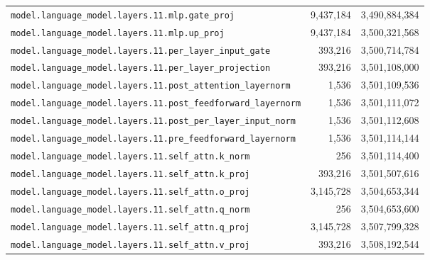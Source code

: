 \documentclass[10pt,a4paper]{article}
\theoremstyle{definition}
\begin{document}
\begin{appendices}
\begin{longtable}{p{9.5cm}rr}
\texttt{model.\allowbreak{}language\_model.\allowbreak{}layers.\allowbreak{}11.\allowbreak{}mlp.\allowbreak{}gate\_proj} & 9,437,184 & 3,490,884,384 \\
\texttt{model.\allowbreak{}language\_model.\allowbreak{}layers.\allowbreak{}11.\allowbreak{}mlp.\allowbreak{}up\_proj} & 9,437,184 & 3,500,321,568 \\
\texttt{model.\allowbreak{}language\_model.\allowbreak{}layers.\allowbreak{}11.\allowbreak{}per\_layer\_input\_gate} & 393,216 & 3,500,714,784 \\
\texttt{model.\allowbreak{}language\_model.\allowbreak{}layers.\allowbreak{}11.\allowbreak{}per\_layer\_projection} & 393,216 & 3,501,108,000 \\
\texttt{model.\allowbreak{}language\_model.\allowbreak{}layers.\allowbreak{}11.\allowbreak{}post\_attention\_layernorm} & 1,536 & 3,501,109,536 \\
\texttt{model.\allowbreak{}language\_model.\allowbreak{}layers.\allowbreak{}11.\allowbreak{}post\_feedforward\_layernorm} & 1,536 & 3,501,111,072 \\
\texttt{model.\allowbreak{}language\_model.\allowbreak{}layers.\allowbreak{}11.\allowbreak{}post\_per\_layer\_input\_norm} & 1,536 & 3,501,112,608 \\
\texttt{model.\allowbreak{}language\_model.\allowbreak{}layers.\allowbreak{}11.\allowbreak{}pre\_feedforward\_layernorm} & 1,536 & 3,501,114,144 \\
\texttt{model.\allowbreak{}language\_model.\allowbreak{}layers.\allowbreak{}11.\allowbreak{}self\_attn.\allowbreak{}k\_norm} & 256 & 3,501,114,400 \\
\texttt{model.\allowbreak{}language\_model.\allowbreak{}layers.\allowbreak{}11.\allowbreak{}self\_attn.\allowbreak{}k\_proj} & 393,216 & 3,501,507,616 \\
\texttt{model.\allowbreak{}language\_model.\allowbreak{}layers.\allowbreak{}11.\allowbreak{}self\_attn.\allowbreak{}o\_proj} & 3,145,728 & 3,504,653,344 \\
\texttt{model.\allowbreak{}language\_model.\allowbreak{}layers.\allowbreak{}11.\allowbreak{}self\_attn.\allowbreak{}q\_norm} & 256 & 3,504,653,600 \\
\texttt{model.\allowbreak{}language\_model.\allowbreak{}layers.\allowbreak{}11.\allowbreak{}self\_attn.\allowbreak{}q\_proj} & 3,145,728 & 3,507,799,328 \\
\texttt{model.\allowbreak{}language\_model.\allowbreak{}layers.\allowbreak{}11.\allowbreak{}self\_attn.\allowbreak{}v\_proj} & 393,216 & 3,508,192,544 \\

\end{longtable}
\end{appendices}
\end{document}
